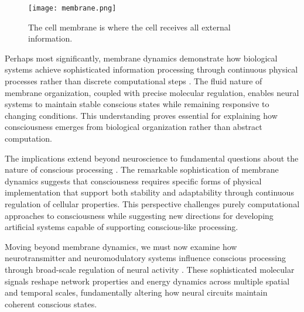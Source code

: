 \begin{figure}[h]
    \centering
    \texttt{[image: membrane.png]}

    \caption{The cell membrane is where the cell receives all external information. }
\end{figure}

Perhaps most significantly, membrane dynamics demonstrate how biological systems achieve sophisticated information processing through continuous physical processes rather than discrete computational steps \cite{Sachs2010}. The fluid nature of membrane organization, coupled with precise molecular regulation, enables neural systems to maintain stable conscious states while remaining responsive to changing conditions. This understanding proves essential for explaining how consciousness emerges from biological organization rather than abstract computation.

The implications extend beyond neuroscience to fundamental questions about the nature of conscious processing \cite{Zimmerberg2006}. The remarkable sophistication of membrane dynamics suggests that consciousness requires specific forms of physical implementation that support both stability and adaptability through continuous regulation of cellular properties. This perspective challenges purely computational approaches to consciousness while suggesting new directions for developing artificial systems capable of supporting conscious-like processing.

Moving beyond membrane dynamics, we must now examine how neurotransmitter and neuromodulatory systems influence conscious processing through broad-scale regulation of neural activity \cite{Choquet2013}. These sophisticated molecular signals reshape network properties and energy dynamics across multiple spatial and temporal scales, fundamentally altering how neural circuits maintain coherent conscious states.
